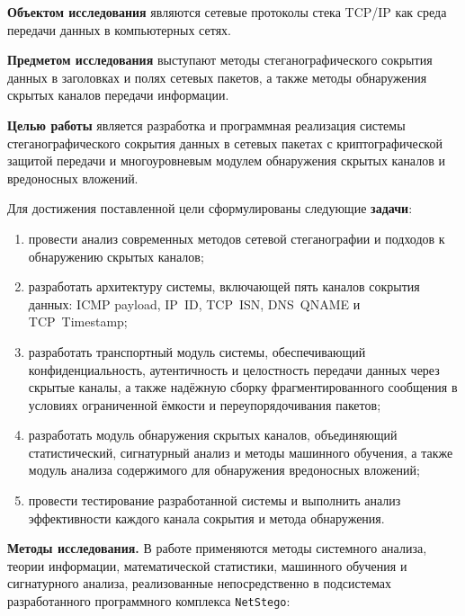 \textbf{Объектом исследования} являются сетевые протоколы стека
TCP/IP как среда передачи данных в компьютерных сетях.

\textbf{Предметом исследования} выступают методы стеганографического
сокрытия данных в заголовках и полях сетевых пакетов, а также методы
обнаружения скрытых каналов передачи информации.

\textbf{Целью работы} является разработка и программная реализация
системы стеганографического сокрытия данных в сетевых пакетах
с криптографической защитой передачи и многоуровневым модулем
обнаружения скрытых каналов и вредоносных вложений.

Для достижения поставленной цели сформулированы следующие
\textbf{задачи}:
\begin{enumerate}
  \item провести анализ современных методов сетевой стеганографии
        и подходов к обнаружению скрытых каналов;
  \item разработать архитектуру системы, включающей пять каналов
        сокрытия данных: ICMP payload, IP~ID, TCP~ISN, DNS~QNAME
        и TCP~Timestamp;
  \item разработать транспортный модуль системы, обеспечивающий
        конфиденциальность, аутентичность и целостность передачи
        данных через скрытые каналы, а также надёжную сборку
        фрагментированного сообщения в условиях ограниченной ёмкости
        и переупорядочивания пакетов;
  \item разработать модуль обнаружения скрытых каналов, объединяющий
        статистический, сигнатурный анализ и методы машинного
        обучения, а также модуль анализа содержимого для обнаружения
        вредоносных вложений;
  \item провести тестирование разработанной системы и выполнить
        анализ эффективности каждого канала сокрытия и метода
        обнаружения.
\end{enumerate}

\textbf{Методы исследования.} В работе применяются методы системного
анализа, теории информации, математической статистики, машинного
обучения и сигнатурного анализа, реализованные непосредственно в
подсистемах разработанного программного комплекса \texttt{NetStego}:

